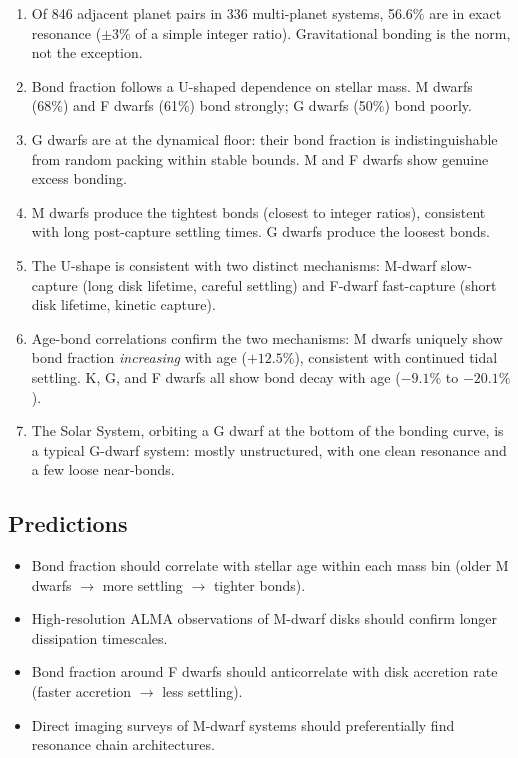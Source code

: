 \documentclass[twocolumn]{aastex631}
\begin{document}
\begin{enumerate}
  \item Of 846 adjacent planet pairs in 336 multi-planet systems, 56.6\% are in
        exact resonance ($\pm 3\%$ of a simple integer ratio). Gravitational
        bonding is the norm, not the exception.
  \item Bond fraction follows a U-shaped dependence on stellar mass. M dwarfs
        (68\%) and F dwarfs (61\%) bond strongly; G dwarfs (50\%) bond poorly.
  \item G dwarfs are at the dynamical floor: their bond fraction is
        indistinguishable from random packing within stable bounds. M and F
        dwarfs show genuine excess bonding.
  \item M dwarfs produce the tightest bonds (closest to integer ratios),
        consistent with long post-capture settling times. G dwarfs produce the
        loosest bonds.
  \item The U-shape is consistent with two distinct mechanisms: M-dwarf
        slow-capture (long disk lifetime, careful settling) and F-dwarf
        fast-capture (short disk lifetime, kinetic capture).
  \item Age-bond correlations confirm the two mechanisms: M dwarfs uniquely
        show bond fraction \textit{increasing} with age ($+12.5\%$), consistent
        with continued tidal settling. K, G, and F dwarfs all show bond decay
        with age ($-9.1\%$ to $-20.1\%$).
  \item The Solar System, orbiting a G dwarf at the bottom of the bonding
        curve, is a typical G-dwarf system: mostly unstructured, with one
        clean resonance and a few loose near-bonds.
\end{enumerate}

\subsection{Predictions}
\begin{itemize}
  \item Bond fraction should correlate with stellar age within each mass bin
        (older M dwarfs $\rightarrow$ more settling $\rightarrow$ tighter bonds).
  \item High-resolution ALMA observations of M-dwarf disks should confirm
        longer dissipation timescales.
  \item Bond fraction around F dwarfs should anticorrelate with disk accretion
        rate (faster accretion $\rightarrow$ less settling).
  \item Direct imaging surveys of M-dwarf systems should preferentially find
        resonance chain architectures.
\end{itemize}
\end{document}
